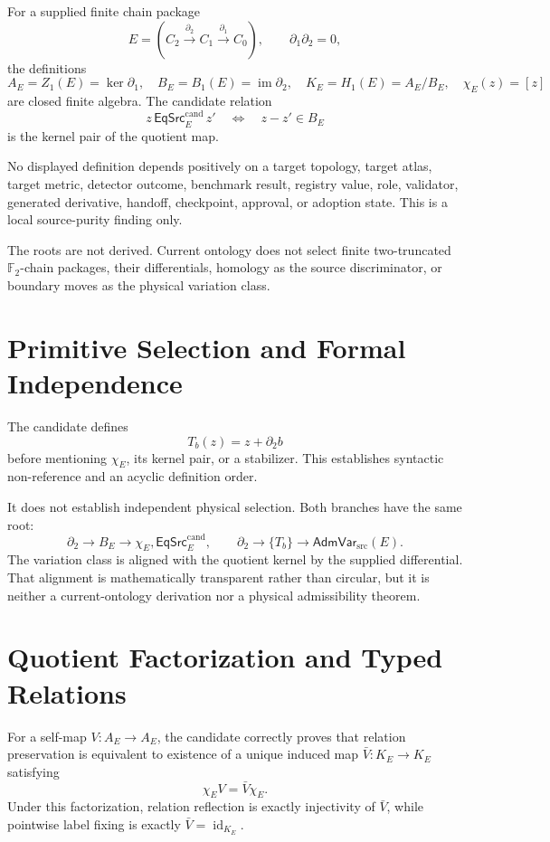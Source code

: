 \documentclass[11pt]{article}
\newcommand{\Ftwo}{\mathbb F_2}
\newcommand{\EqCand}{\mathsf{EqSrc}^{\mathrm{cand}}}
\newcommand{\AdmVar}{\mathsf{AdmVar}_{\mathrm{src}}}
\begin{document}
For a supplied finite chain package
\[
E=(C_2\xrightarrow{\partial_2}C_1\xrightarrow{\partial_1}C_0),
\qquad \partial_1\partial_2=0,
\]
the definitions
\[
A_E=Z_1(E)=\ker\partial_1,\quad
B_E=B_1(E)=\operatorname{im}\partial_2,\quad
K_E=H_1(E)=A_E/B_E,\quad \chi_E(z)=[z]
\]
are closed finite algebra. The candidate relation
\[
z\,\EqCand_E\,z'\quad\Longleftrightarrow\quad z-z'\in B_E
\]
is the kernel pair of the quotient map.

No displayed definition depends positively on a target topology, target
atlas, target metric, detector outcome, benchmark result, registry value,
role, validator, generated derivative, handoff, checkpoint, approval, or
adoption state. This is a local source-purity finding only.

The roots are not derived. Current ontology does not select finite
two-truncated \(\Ftwo\)-chain packages, their differentials, homology as the
source discriminator, or boundary moves as the physical variation class.

\section{Primitive Selection and Formal Independence}

The candidate defines
\[
T_b(z)=z+\partial_2b
\]
before mentioning \(\chi_E\), its kernel pair, or a stabilizer. This
establishes syntactic non-reference and an acyclic definition order.

It does not establish independent physical selection. Both branches have the
same root:
\[
\partial_2\longrightarrow B_E\longrightarrow\chi_E,\EqCand_E,
\qquad
\partial_2\longrightarrow\{T_b\}\longrightarrow\AdmVar(E).
\]
The variation class is aligned with the quotient kernel by the supplied
differential. That alignment is mathematically transparent rather than
circular, but it is neither a current-ontology derivation nor a physical
admissibility theorem.

\section{Quotient Factorization and Typed Relations}

For a self-map \(V:A_E\to A_E\), the candidate correctly proves that relation
preservation is equivalent to existence of a unique induced map
\(\bar V:K_E\to K_E\) satisfying
\[
\chi_EV=\bar V\chi_E.
\]
Under this factorization, relation reflection is exactly injectivity of
\(\bar V\), while pointwise label fixing is exactly
\(\bar V=\operatorname{id}_{K_E}\).
\end{document}
